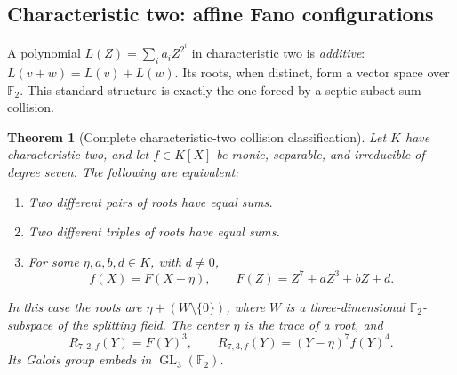 \documentclass[11pt,a4paper]{article}
\newtheorem{theorem}{Theorem}[section]
\theoremstyle{definition}
\theoremstyle{remark}
\newcommand{\F}{\mathbb F}
\begin{document}
\subsection{Characteristic two: affine Fano configurations}

A polynomial $L(Z)=\sum_i a_iZ^{2^i}$ in characteristic two is
\emph{additive}: $L(v+w)=L(v)+L(w)$. Its roots, when distinct, form a
vector space over $\F_2$. This standard structure is exactly the one forced
by a septic subset-sum collision.

\begin{theorem}[Complete characteristic-two collision classification]
\label{thm:2rigidity}
Let $K$ have characteristic two, and let $f\in K[X]$ be monic, separable,
and irreducible of degree seven. The following are equivalent:
\begin{enumerate}[label=(\roman*)]
\item Two different pairs of roots have equal sums.
\item Two different triples of roots have equal sums.
\item For some $\eta,a,b,d\in K$, with $d\neq0$,
\begin{equation}
 f(X)=F(X-\eta),\qquad F(Z)=Z^7+aZ^3+bZ+d.
 \label{eq:additivequotient}
\end{equation}
\end{enumerate}
In this case the roots are $\eta+(W\setminus\{0\})$, where $W$ is a
three-dimensional $\F_2$-subspace of the splitting field. The center
$\eta$ is the trace of a root, and
\begin{equation}
 R_{7,2,f}(Y)=F(Y)^3,\qquad
 R_{7,3,f}(Y)=(Y-\eta)^7f(Y)^4.
 \label{eq:Fanoresolvents}
\end{equation}
Its Galois group embeds in $\operatorname{GL}_3(\F_2)$.
\end{theorem}
\end{document}
